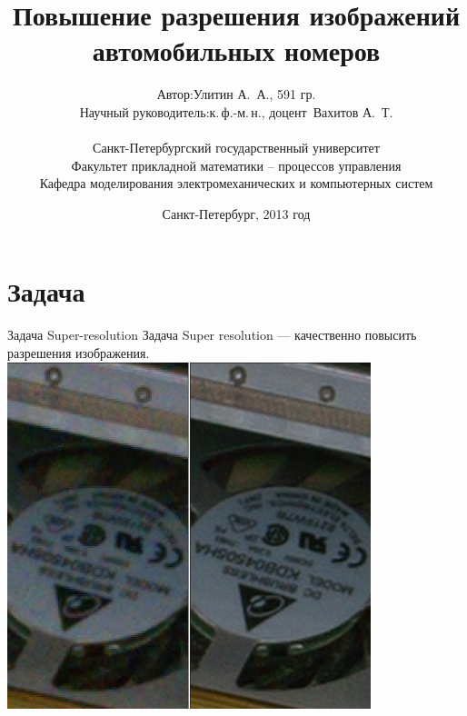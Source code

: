 \title{Повышение разрешения изображений автомобильных номеров}
\author{
  \begin{tabular}[4cm]{rl}
 Автор:                & Улитин А.~А., 591 гр. \\
 Научный руководитель: & к.\,ф.-м.\,н., доцент~Вахитов А.~Т. \\
 \end{tabular}
 \vspace{3em} \\
 Санкт-Петербургский государственный университет \\
 Факультет прикладной математики -- процессов управления \\
 Кафедра моделирования электромеханических и компьютерных систем \\
 }
\date{Санкт-Петербург, 2013 год}

\begin{frame}{}
		\maketitle
\end{frame}

\section{Задача}
\begin{frame}{Задача Super-resolution}
  Задача Super resolution --- качественно повысить разрешения изображения.
  \includegraphics[height=\textheight]{content/An_example_of_super_resolution_with_still_RAW_photo.jpg}
\end{frame}

